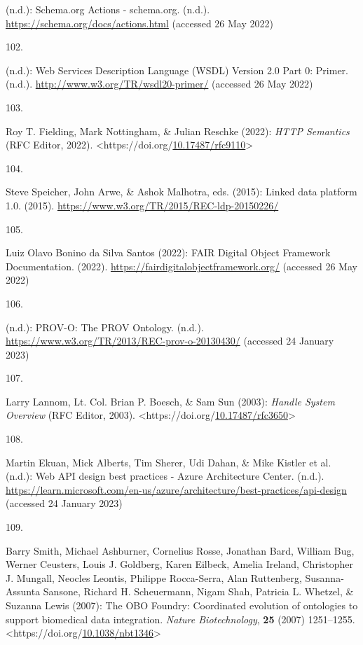 \begin{thebibliography}{9}
(n.d.): Schema.org {Actions} - schema.org. (n.d.).
\url{https://schema.org/docs/actions.html} (accessed 26 May 2022)

\hypertarget{ref-w3-wsdl20-primer}{}
102.

(n.d.): Web {Services Description Language} ({WSDL}) {Version} 2.0
{Part} 0: {Primer}. (n.d.). \url{http://www.w3.org/TR/wsdl20-primer/}
(accessed 26 May 2022)

\hypertarget{ref-rfc9110}{}
103.

Roy T. Fielding, Mark Nottingham, \& Julian Reschke (2022): \emph{{HTTP
Semantics}} ({RFC Editor}, 2022).
\textless https://doi.org/\href{https://doi.org/10.17487/rfc9110}{10.17487/rfc9110}\textgreater{}

\hypertarget{ref-w3-ldp}{}
104.

Steve Speicher, John Arwe, \& Ashok Malhotra, eds. (2015): Linked data
platform 1.0. (2015). \url{https://www.w3.org/TR/2015/REC-ldp-20150226/}

\hypertarget{ref-FDOFramework}{}
105.

Luiz Olavo Bonino da Silva Santos (2022): {FAIR Digital Object Framework
Documentation}. (2022). \url{https://fairdigitalobjectframework.org/}
(accessed 26 May 2022)

\hypertarget{ref-w3-prov-o}{}
106.

(n.d.): {PROV-O}: {The PROV Ontology}. (n.d.).
\url{https://www.w3.org/TR/2013/REC-prov-o-20130430/} (accessed 24
January 2023)

\hypertarget{ref-rfc3650}{}
107.

Larry Lannom, Lt. Col. Brian P. Boesch, \& Sam Sun (2003): \emph{Handle
{System Overview}} ({RFC Editor}, 2003).
\textless https://doi.org/\href{https://doi.org/10.17487/rfc3650}{10.17487/rfc3650}\textgreater{}

\hypertarget{ref-martinekuanWebAPIDesign}{}
108.

Martin Ekuan, Mick Alberts, Tim Sherer, Udi Dahan, \& Mike Kistler et
al. (n.d.): Web {API} design best practices - {Azure Architecture
Center}. (n.d.).
\url{https://learn.microsoft.com/en-us/azure/architecture/best-practices/api-design}
(accessed 24 January 2023)

\hypertarget{ref-smithOBOFoundryCoordinated2007a}{}
109.

Barry Smith, Michael Ashburner, Cornelius Rosse, Jonathan Bard, William
Bug, Werner Ceusters, Louis J. Goldberg, Karen Eilbeck, Amelia Ireland,
Christopher J. Mungall, Neocles Leontis, Philippe Rocca-Serra, Alan
Ruttenberg, Susanna-Assunta Sansone, Richard H. Scheuermann, Nigam Shah,
Patricia L. Whetzel, \& Suzanna Lewis (2007): The {OBO Foundry}:
Coordinated evolution of ontologies to support biomedical data
integration. \emph{Nature Biotechnology}, \textbf{25} (2007) 1251--1255.
\textless https://doi.org/\href{https://doi.org/10.1038/nbt1346}{10.1038/nbt1346}\textgreater{}


\end{thebibliography}
